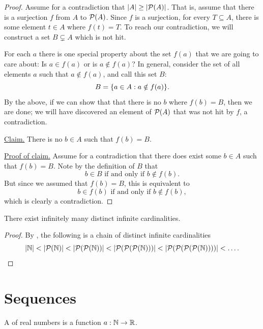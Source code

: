 \documentclass[11pt,twoside=off,numbers=noenddot]{scrbook}
\begin{document}
\begin{proof}
  Assume for a contradiction that $| A | \geq | \mathcal{P}(A) |$.
  That is, assume that there is a surjection $f$ from $A$ to
  $\mathcal{P}(A)$. Since $f$ is a surjection, for every $T \subseteq A$,
  there is some element $t \in A$ where $f(t) = T$. To reach our
  contradiction, we will construct a set $B \subsetneq A$ which is not hit.

  For each $a$ there is one special property about the set $f(a)$
  that we are going to care about: Is $a \in f(a)$ or is $a \notin
  f(a)$? In general, consider the set of all elements $a$ such that
  $a \notin f(a)$, and call this set $B$:
  \[ B = \{ a \in A : a \notin f(a) \}. \]
  By the above, if we can show that that there is no $b$ where $f(b)
  = B$, then we are done; we will have discovered an element of
  $\mathcal{P}(A)$ that was not hit by $f$, a contradiction.

  \underline{Claim.} There is no $b \in A$ such that $f(b) = B$.

  \underline{Proof of claim.} Assume for a contradiction that there
  does exist some $b \in A$ such that $f(b) = B$. Note by the
  definition of $B$ that
  \[ \text{$b \in B$ if and only if $b \notin f(b)$}. \]
  But since we assumed that $f(b) = B$, this is equivalent to
  \[ \text{$b \in f(b)$ if and only if $b \notin f(b)$}, \]
  which is clearly a contradiction.
\end{proof}

\begin{corollary}
  There exist infinitely many distinct infinite cardinalities.
\end{corollary}

\begin{proof}
  By , the following is a chain
  of distinct infinite cardinalities
  \[ | \mathbb N | < | \mathcal{P}(\mathbb N) | < | \mathcal{P}(\mathcal{P}(\mathbb N)) | <
    | \mathcal{P}(\mathcal{P}(\mathcal{P}(\mathbb N))) | <
  | \mathcal{P}(\mathcal{P}(\mathcal{P}(\mathcal{P}(\mathbb N)))) | < \dots.\]
\end{proof}

\chapter{Sequences}
\begin{definition}[Sequences]
  A  of real numbers is a function $a : \mathbb N \to \mathbb R$.
\end{definition}
\end{document}
